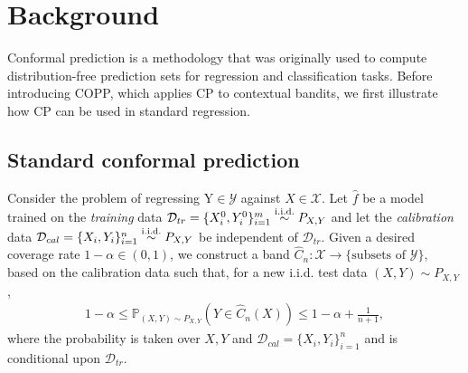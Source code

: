 \section{Background}
Conformal prediction \citep{vovk2005algorithmic, shafer2008tutorial} is a methodology that was originally used to compute distribution-free prediction sets for regression and classification tasks. Before introducing COPP, which applies CP to contextual bandits, we first illustrate how CP can be used in standard regression.



\subsection{Standard conformal prediction} 



Consider the problem of regressing $\mbox{Y} \in \mathcal{Y}$ against $X\in \mathcal{X}$.
Let $\hat{f}$ be a model trained on the \emph{training} data $\mathcal{D}_{tr} = \{X_i^0, Y_i^0\}_{i=1}^m \overset{\textup{i.i.d.}}{\sim} P_{X,Y}$ and let the \emph{calibration} data $\mathcal{D}_{cal} = \{X_i, Y_i\}_{i=1}^n \overset{\textup{i.i.d.}}{\sim} P_{X,Y}$ be independent of $\mathcal{D}_{tr}$. Given a desired coverage rate $1-\alpha \in (0,1)$, we construct a band $\hat{C}_n:\mathcal{X}\rightarrow \{\text{subsets of }\mathcal{Y}\}$, based on the calibration data such that, for a new i.i.d. test data $(X,Y) \sim P_{X,Y}$,
\begin{align}
    1-\alpha \leq \mathbb{P}_{(X,Y)\sim P_{X,Y}}(Y\in \hat{C}_n(X)) \leq 1-\alpha + \frac{1}{n+1}, \label{cp_guarantee}
\end{align}
where the probability is taken over $X,Y$ and $\mathcal{D}_{cal} = \{X_i, Y_i\}_{i=1}^n$ and is conditional upon $\mathcal{D}_{tr}$.

